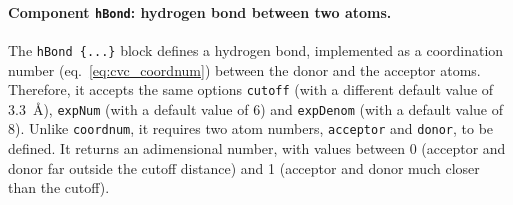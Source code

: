 \paragraph*{Component \texttt{hBond}: hydrogen bond between two
  atoms.}  The \texttt{hBond \{...\}} block defines a hydrogen
bond, implemented as a coordination number (eq.~\ref{eq:cvc_coordnum})
between the donor and the acceptor atoms.  Therefore, it accepts the
same options \texttt{cutoff} (with a different default value of
3.3~\AA{}), \texttt{expNum} (with a default value of 6) and
\texttt{expDenom} (with a default value of 8).  Unlike
\texttt{coordnum}, it requires two atom numbers, \texttt{acceptor} and
\texttt{donor}, to be defined.  It returns an adimensional number,
with values between 0 (acceptor and donor far outside the cutoff
distance) and 1 (acceptor and donor much closer than the cutoff).


